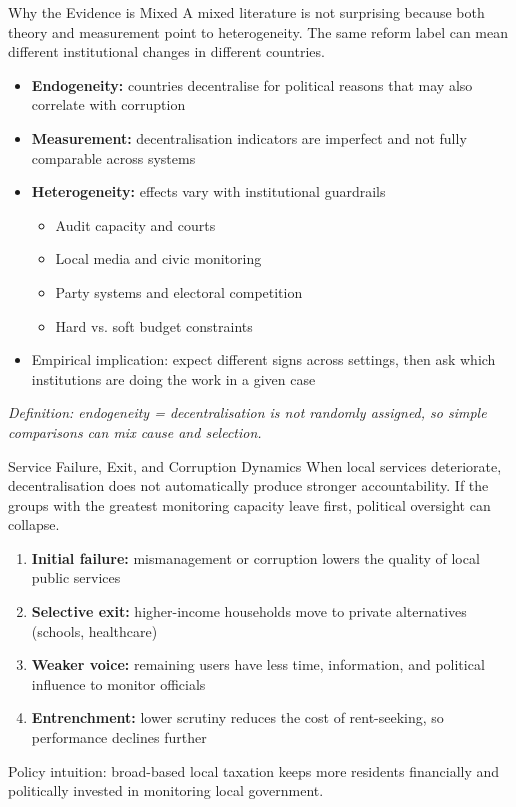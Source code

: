 \documentclass[10pt]{beamer}
\begin{document}
\begin{frame}{Why the Evidence is Mixed}
\small
A mixed literature is not surprising because both theory and measurement point to heterogeneity.
The same reform label can mean different institutional changes in different countries.

\begin{itemize}
\item \textbf{Endogeneity:} countries decentralise for political reasons that may also correlate with corruption
\item \textbf{Measurement:} decentralisation indicators are imperfect and not fully comparable across systems
\item \textbf{Heterogeneity:} effects vary with institutional guardrails
\begin{itemize}
\item Audit capacity and courts
\item Local media and civic monitoring
\item Party systems and electoral competition
\item Hard vs. soft budget constraints
\end{itemize}
\item Empirical implication: expect different signs across settings, then ask which institutions are doing the work in a given case
\end{itemize}

\vspace{0.1cm}
\footnotesize
\textit{Definition: endogeneity = decentralisation is not randomly assigned, so simple comparisons can mix cause and selection.}
\end{frame}

\begin{frame}{Service Failure, Exit, and Corruption Dynamics}
When local services deteriorate, decentralisation does not automatically produce stronger accountability.
If the groups with the greatest monitoring capacity leave first, political oversight can collapse.

\begin{enumerate}
\item \textbf{Initial failure:} mismanagement or corruption lowers the quality of local public services
\item \textbf{Selective exit:} higher-income households move to private alternatives (schools, healthcare)
\item \textbf{Weaker voice:} remaining users have less time, information, and political influence to monitor officials
\item \textbf{Entrenchment:} lower scrutiny reduces the cost of rent-seeking, so performance declines further
\end{enumerate}

\vspace{0.15cm}
\alert{\footnotesize Policy intuition: broad-based local taxation keeps more residents financially and politically invested in monitoring local government.}
\end{frame}
\end{document}
